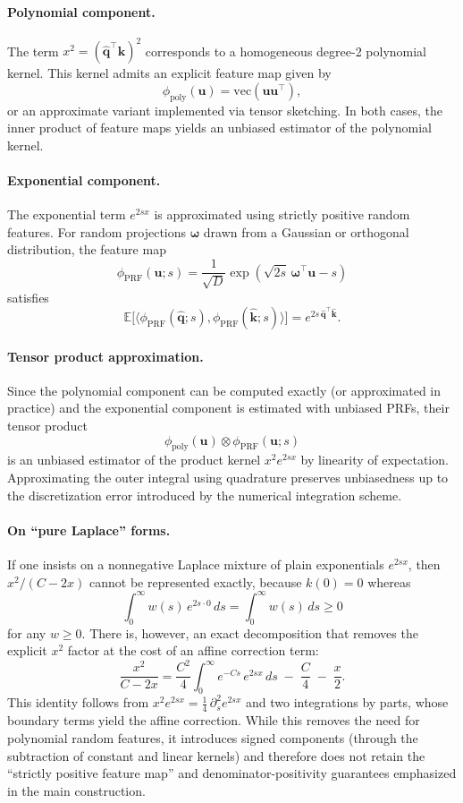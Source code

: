 \documentclass{article}
\begin{document}
\paragraph{Polynomial component.}
The term
$x^2 = (\widehat{\mathbf{q}}^\top \widehat{\mathbf{k}})^2$
corresponds to a homogeneous degree-2 polynomial kernel.
This kernel admits an explicit feature map given by
\[
\phi_{\mathrm{poly}}(\mathbf{u})
=
\mathrm{vec}(\mathbf{u}\mathbf{u}^\top),
\]
or an approximate variant implemented via tensor sketching.
In both cases, the inner product of feature maps yields an unbiased
estimator of the polynomial kernel.

\paragraph{Exponential component.}
The exponential term $e^{2s x}$ is approximated using strictly positive
random features.
For random projections $\boldsymbol{\omega}$ drawn from a Gaussian or
orthogonal distribution, the feature map
\[
\phi_{\mathrm{PRF}}(\mathbf{u}; s)
=
\frac{1}{\sqrt{D}}
\exp\!\left(\sqrt{2s}\,\boldsymbol{\omega}^\top \mathbf{u} - s\right)
\]
satisfies
\[
\mathbb{E}\big[
\langle
\phi_{\mathrm{PRF}}(\widehat{\mathbf{q}}; s),
\phi_{\mathrm{PRF}}(\widehat{\mathbf{k}}; s)
\rangle
\big]
=
e^{2s\, \widehat{\mathbf{q}}^\top \widehat{\mathbf{k}}}.
\]

\paragraph{Tensor product approximation.}
Since the polynomial component can be computed exactly (or approximated
in practice) and the exponential component is estimated with unbiased
PRFs, their tensor product
\[
\phi_{\mathrm{poly}}(\mathbf{u})
\otimes
\phi_{\mathrm{PRF}}(\mathbf{u}; s)
\]
is an unbiased estimator of the product kernel
$x^2 e^{2s x}$ by linearity of expectation.
Approximating the outer integral using quadrature preserves unbiasedness
up to the discretization error introduced by the numerical integration
scheme.

\paragraph{On ``pure Laplace'' forms.}
If one insists on a nonnegative Laplace mixture of plain exponentials
$e^{2sx}$, then $x^2/(C-2x)$ cannot be represented exactly, because
$k(0)=0$ whereas
\[
\int_0^\infty w(s)\,e^{2s\cdot 0}\,ds
=
\int_0^\infty w(s)\,ds
\ge 0
\]
for any $w\ge 0$.
There is, however, an exact decomposition that removes the explicit
$x^2$ factor at the cost of an affine correction term:
\[
\frac{x^2}{C-2x}
=
\frac{C^2}{4}\int_0^\infty e^{-Cs}\,e^{2sx}\,ds
\;-\;
\frac{C}{4}
\;-\;
\frac{x}{2}.
\]
This identity follows from
$x^2 e^{2sx}=\tfrac{1}{4}\,\partial_s^2 e^{2sx}$
and two integrations by parts, whose boundary terms yield the affine
correction.
While this removes the need for polynomial random features, it
introduces signed components (through the subtraction of constant and
linear kernels) and therefore does not retain the
``strictly positive feature map'' and denominator-positivity guarantees
emphasized in the main construction.
\end{document}
